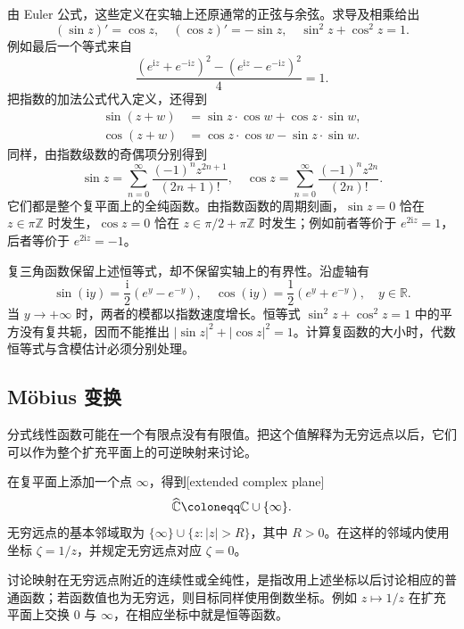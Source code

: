 由 Euler 公式，这些定义在实轴上还原通常的正弦与余弦。求导及相乘给出
\[
(\sin z)'=\cos z,
\quad (\cos z)'=-\sin z,
\quad \sin^2z+\cos^2z=1.
\]
例如最后一个等式来自
\[
\frac{(e^{\mathrm{i}z}+e^{-\mathrm{i}z})^2
-(e^{\mathrm{i}z}-e^{-\mathrm{i}z})^2}{4}=1.
\]
把指数的加法公式代入定义，还得到
\[
\begin{aligned}
\sin(z+w)&=\sin z\cdot\cos w+\cos z\cdot\sin w,\\
\cos(z+w)&=\cos z\cdot\cos w-\sin z\cdot\sin w.
\end{aligned}
\]
同样，由指数级数的奇偶项分别得到
\[
\sin z=\sum_{n=0}^{\infty}\frac{(-1)^nz^{2n+1}}{(2n+1)!},
\quad
\cos z=\sum_{n=0}^{\infty}\frac{(-1)^nz^{2n}}{(2n)!}.
\]
它们都是整个复平面上的全纯函数。由指数函数的周期刻画，\(\sin z=0\) 恰在 \(z\in\pi\mathbb Z\) 时发生，\(\cos z=0\) 恰在 \(z\in\pi/2+\pi\mathbb Z\) 时发生；例如前者等价于 \(e^{2\mathrm{i}z}=1\)，后者等价于 \(e^{2\mathrm{i}z}=-1\)。

\ProseParagraphBreak
复三角函数保留上述恒等式，却不保留实轴上的有界性。沿虚轴有
\[
\sin(\mathrm{i}y)=\frac{\mathrm{i}}2(e^y-e^{-y}),
\quad \cos(\mathrm{i}y)=\frac12(e^y+e^{-y}),
\quad y\in\mathbb R.
\]
当 \(y\rightarrow+\infty\) 时，两者的模都以指数速度增长。恒等式 \(\sin^2z+\cos^2z=1\) 中的平方没有复共轭，因而不能推出 \(|\sin z|^2+|\cos z|^2=1\)。计算复函数的大小时，代数恒等式与含模估计必须分别处理。

\subsection{Möbius 变换}
\label{b3:subsec:010304}

分式线性函数可能在一个有限点没有有限值。把这个值解释为无穷远点以后，它们可以作为整个扩充平面上的可逆映射来讨论。

\begin{definition}
\label{b3:def:01-elementary-extended-plane}
在复平面上添加一个点 \(\infty\)，得到[extended complex plane]
\[
\widehat{\mathbb C\kern0pt}\coloneqq\mathbb C\cup\{\infty\}.
\]
无穷远点的基本邻域取为 \(\{\infty\}\cup\{z:|z|>R\}\)，其中 \(R>0\)。在这样的邻域内使用坐标 \(\zeta=1/z\)，并规定无穷远点对应 \(\zeta=0\)。
\end{definition}

讨论映射在无穷远点附近的连续性或全纯性，是指改用上述坐标以后讨论相应的普通函数；若函数值也为无穷远，则目标同样使用倒数坐标。例如 \(z\mapsto1/z\) 在扩充平面上交换 \(0\) 与 \(\infty\)，在相应坐标中就是恒等函数。

